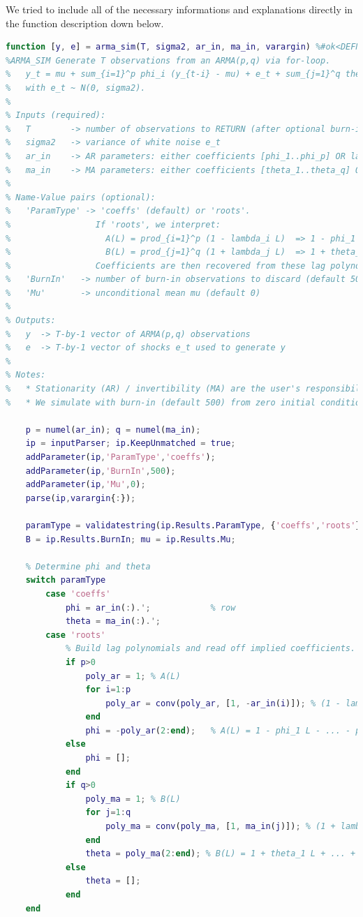 \documentclass[dvipsnames,11pt]{article}
\begin{document}
    \begin{solution}

        We tried to include all of the necessary informations and explanations directly in the function description down below.

\begin{lstlisting}[language=Matlab]
function [y, e] = arma_sim(T, sigma2, ar_in, ma_in, varargin) %#ok<DEFNU>
%ARMA_SIM Generate T observations from an ARMA(p,q) via for-loop.
%   y_t = mu + sum_{i=1}^p phi_i (y_{t-i} - mu) + e_t + sum_{j=1}^q theta_j e_{t-j}
%   with e_t ~ N(0, sigma2).
%
% Inputs (required):
%   T        -> number of observations to RETURN (after optional burn-in)
%   sigma2   -> variance of white noise e_t
%   ar_in    -> AR parameters: either coefficients [phi_1..phi_p] OR lag-roots [lambda_1..lambda_p]
%   ma_in    -> MA parameters: either coefficients [theta_1..theta_q] OR lag-roots [lambda_1..lambda_q]
%
% Name-Value pairs (optional):
%   'ParamType' -> 'coeffs' (default) or 'roots'.
%                 If 'roots', we interpret:
%                   A(L) = prod_{i=1}^p (1 - lambda_i L)  => 1 - phi_1 L - ... - phi_p L^p
%                   B(L) = prod_{j=1}^q (1 + lambda_j L)  => 1 + theta_1 L + ... + theta_q L^q
%                 Coefficients are then recovered from these lag polynomials.
%   'BurnIn'   -> number of burn-in observations to discard (default 500)
%   'Mu'       -> unconditional mean mu (default 0)
%
% Outputs:
%   y  -> T-by-1 vector of ARMA(p,q) observations
%   e  -> T-by-1 vector of shocks e_t used to generate y
%
% Notes:
%   * Stationarity (AR) / invertibility (MA) are the user's responsibility.
%   * We simulate with burn-in (default 500) from zero initial conditions.

    p = numel(ar_in); q = numel(ma_in);
    ip = inputParser; ip.KeepUnmatched = true;
    addParameter(ip,'ParamType','coeffs');
    addParameter(ip,'BurnIn',500);
    addParameter(ip,'Mu',0);
    parse(ip,varargin{:});

    paramType = validatestring(ip.Results.ParamType, {'coeffs','roots'});
    B = ip.Results.BurnIn; mu = ip.Results.Mu;

    % Determine phi and theta
    switch paramType
        case 'coeffs'
            phi = ar_in(:).';            % row
            theta = ma_in(:).';
        case 'roots'
            % Build lag polynomials and read off implied coefficients.
            if p>0
                poly_ar = 1; % A(L)
                for i=1:p
                    poly_ar = conv(poly_ar, [1, -ar_in(i)]); % (1 - lambda_i L)
                end
                phi = -poly_ar(2:end);   % A(L) = 1 - phi_1 L - ... - phi_p L^p
            else
                phi = [];
            end
            if q>0
                poly_ma = 1; % B(L)
                for j=1:q
                    poly_ma = conv(poly_ma, [1, ma_in(j)]); % (1 + lambda_j L)
                end
                theta = poly_ma(2:end); % B(L) = 1 + theta_1 L + ... + theta_q L^q
            else
                theta = [];
            end
    end


\end{lstlisting}
\end{solution}
\end{document}
